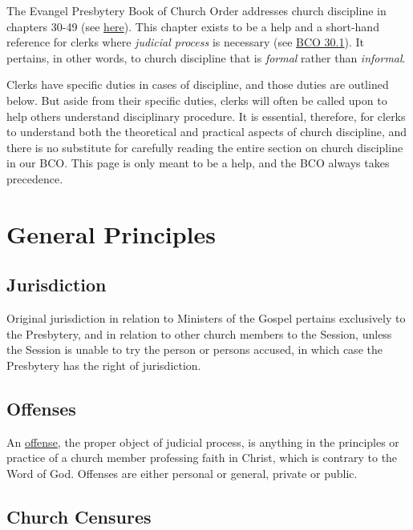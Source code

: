 \documentclass[
]{book}
\begin{document}
The Evangel Presbytery Book of Church Order addresses church discipline in chapters 30-49 (see \href{https://evangel.pressbooks.com/chapter/30-discipline-its-nature-subjects-and-ends/}{here}). This chapter exists to be a help and a short-hand reference for clerks where \emph{judicial process} is necessary (see \href{https://evangel.pressbooks.com/chapter/30-discipline-its-nature-subjects-and-ends/}{BCO 30.1}). It pertains, in other words, to church discipline that is \emph{formal} rather than \emph{informal}.

Clerks have specific duties in cases of discipline, and those duties are outlined below. But aside from their specific duties, clerks will often be called upon to help others understand disciplinary procedure. It is essential, therefore, for clerks to understand both the theoretical and practical aspects of church discipline, and there is no substitute for carefully reading the entire section on church discipline in our BCO. This page is only meant to be a help, and the BCO always takes precedence.

\hypertarget{general-principles}{%
\section{General Principles}\label{general-principles}}

\hypertarget{jurisdiction}{%
\subsection{Jurisdiction}\label{jurisdiction}}

Original jurisdiction in relation to Ministers of the Gospel pertains exclusively to the Presbytery, and in relation to other church members to the Session, unless the Session is unable to try the person or persons accused, in which case the Presbytery has the right of jurisdiction.

\hypertarget{offenses}{%
\subsection{Offenses}\label{offenses}}

An \href{https://evangel.pressbooks.com/chapter/32-offenses/}{offense}, the proper object of judicial process, is anything in the principles or practice of a church member professing faith in Christ, which is contrary to the Word of God. Offenses are either personal or general, private or public.

\hypertarget{church-censures}{%
\subsection{Church Censures}\label{church-censures}}
\end{document}
